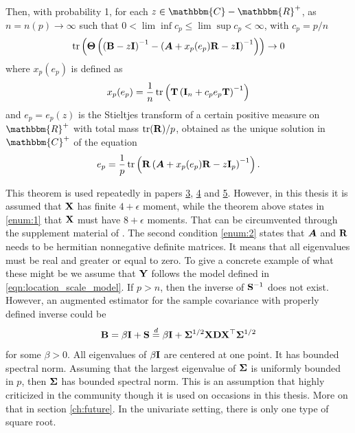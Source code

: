 \documentclass[12pt, oneside]{book}\usepackage{knitr}
\begin{document}
{\begin{theorem}
Then, with probability 1, for each $z\in \mathbbm{C}-\mathbbm{R}^+$, as $n=n(p) \rightarrow \infty$ such that $0<\lim\inf c_p \leq \lim \sup c_p < \infty$, with $c_p = p/n$
\begin{equation}
  \operatorname{tr}\left(\mathbf{\Theta}\left( \left(\mathbf{B} - z\mathbf{I}\right)^{-1} - \left( \mbox{\boldmath$A$} + x_p(e_p)\mathbf{R} - z\mathbf{I} \right)^{-1} \right) \right) \rightarrow 0
\end{equation}
where $x_p(e_p)$ is defined as
\begin{equation}
  x_p(e_p) = \frac{1}{n}\operatorname{tr} \left( \mathbf{T} \left(\mathbf{I}_n + c_p e_p \mathbf{T} \right)^{-1} \right)
\end{equation}
and $e_p=e_p(z)$ is the Stieltjes transform of a certain positive measure on $\mathbbm{R}^+$ with total mass $\operatorname{tr}(\mathbf{R})/p$, obtained as the unique solution in $\mathbbm{C}^+$ of the equation
\begin{equation}
  e_p = \frac{1}{p}\operatorname{tr} \left( \mathbf{R} \left(\mbox{\boldmath$A$} +  x_p(e_p) \mathbf{R} - z\mathbf{I}_p \right)^{-1} \right).
\end{equation}
\end{theorem}
This theorem is used repeatedly in papers \hyperref[sec:paper3]{3}, \hyperref[sec:paper4]{4} and \hyperref[sec:paper5]{5}.
However, in this thesis it is assumed that $\mathbf{X}$ has finite $4+\epsilon$ moment, while the theorem above states in \ref{enum:1} that $\mathbf{X}$ must have $8+\epsilon$ moments. 
That can be circumvented through the supplement material of \citet{BodnarGuptaParolya2016}.
The second condition \ref{enum:2} states that $\mbox{\boldmath$A$}$ and $\mathbf{R}$ needs to be hermitian nonnegative definite matrices.
It means that all eigenvalues must be real and greater or equal to zero.
To give a concrete example of what these might be we assume that $\mathbf{Y}$ follows the model defined in \eqref{eqn:location_scale_model}.
If $p>n$, then the inverse of $\mathbf{S}^{-1}$ does not exist.
However, an augmented estimator for the sample covariance with properly defined inverse could be 
\begin{equation}\label{eqn:bb}
\mathbf{B} = \beta\mathbf{I} + \mathbf{S} \stackrel{d}{=} \beta \mathbf{I} + \mathbf{\Sigma}^{1/2}\mathbf{X} \mathbf{D} \mathbf{X}^\top \mathbf{\Sigma}^{1/2}
\end{equation}
for some $\beta >0$.
All eigenvalues of $\beta \mathbf{I}$ are centered at one point. 
It has bounded spectral norm. 
Assuming that the largest eigenvalue of $\mathbf{\Sigma}$ is uniformly bounded in $p$, then $\mathbf{\Sigma}$ has bounded spectral norm.
This is an assumption that highly criticized in the community though it is used on occasions in this thesis.
More on that in section \ref{ch:future}.
In the univariate setting, there is only one type of square root.
}
\end{document}
